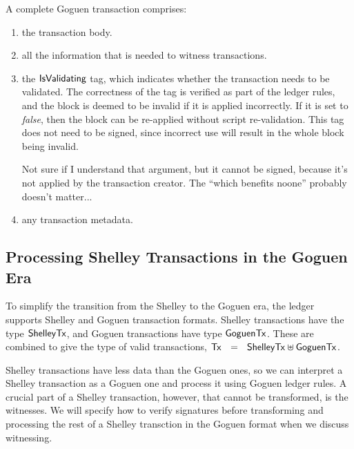 A complete Goguen transaction comprises:

\begin{enumerate}
  \item the transaction body.
  \item all the information that is needed to witness transactions.
  \item the $\mathsf{IsValidating}$ tag, which indicates whether the transaction needs to be validated.
  The correctness of the tag is verified as part of the ledger rules, and the block is
  deemed to be invalid if it is applied incorrectly.
  If it is set to \emph{false}, then the block can be re-applied without script re-validation.
  This tag does not need to be signed, since incorrect use will result
  in the whole block being invalid.
  \begin{note}
    Not sure if I understand that argument, but it cannot be signed,
    because it's not applied by the transaction creator.
    The ``which benefits noone'' probably doesn't matter...
  \end{note}
  \item any transaction metadata.
\end{enumerate}


\subsection{Processing Shelley Transactions in the Goguen Era}

To simplify the transition from the Shelley to the Goguen era, the ledger supports Shelley and Goguen transaction formats.
Shelley transactions have the type $\mathsf{ShelleyTx}$, and  Goguen transactions have type $\mathsf{GoguenTx}$.
These are combined to give the type of valid transactions,
$\mathsf{Tx} ~~=~~ \mathsf{ShelleyTx} \uplus \mathsf{GoguenTx}$.

Shelley transactions have less data than the Goguen ones, so we can interpret
a Shelley transaction as a Goguen one and process it using Goguen ledger
rules. A crucial part of a Shelley transaction,
however, that cannot be transformed, is the witnesses.
We will specify how to verify signatures before transforming and processing
the rest of a Shelley transction in the Goguen format when we discuss witnessing.

